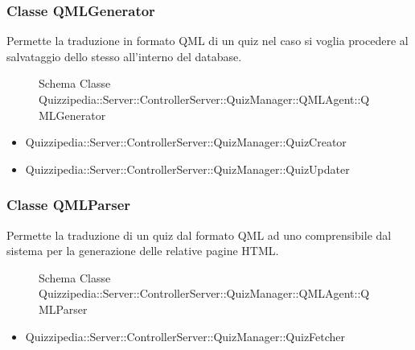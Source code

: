 \subsubsection{Classe QMLGenerator}
Permette la traduzione in formato QML di un quiz nel caso si voglia procedere al salvataggio dello stesso all'interno del database.
\begin{figure}[H]
\centering
\noindent{}
\caption[Schema Classe QMLGenerator]{Schema Classe Quizzipedia::Server::ControllerServer::QuizManager::QMLAgent::QMLGenerator}
\end{figure}
\begin{itemize}
\item Quizzipedia::Server::ControllerServer::QuizManager::QuizCreator
\item Quizzipedia::Server::ControllerServer::QuizManager::QuizUpdater
\end{itemize}
\subsubsection{Classe QMLParser}
Permette la traduzione di un quiz dal formato QML ad uno comprensibile dal sistema per la generazione delle relative pagine HTML.
\begin{figure}[H]
\centering
\noindent{}
\caption[Schema Classe QMLParser]{Schema Classe Quizzipedia::Server::ControllerServer::QuizManager::QMLAgent::QMLParser}
\end{figure}
\begin{itemize}
\item Quizzipedia::Server::ControllerServer::QuizManager::QuizFetcher
\end{itemize}
